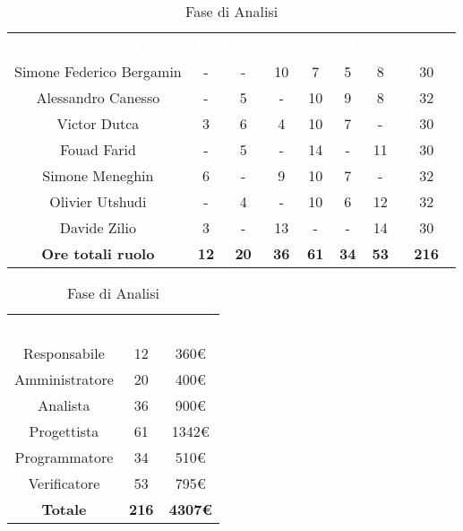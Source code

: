 \renewcommand{\arraystretch}{1.5}


\begin{comment}
BASE PER TUTTI: 30 ORE
Canesso: +2 ore perchè sa che dopo dovrà farne di meno (tanti arretrati)
Utshudi & Meneghin: +2 ore perchè meno arretrati
\end{comment}

\begin{table}[H]
\centering\renewcommand{\arraystretch}{1.5}
\caption{Fase di Analisi}
\vspace{0.2cm}
\begin{tabular}{ c | c | c | c | c | c | c | c }
\rowcolor{redafk}
\textcolor{white}{\textbf{Nominativo}} & \textcolor{white}{\textbf{Re}} & 
\textcolor{white}{\textbf{Am}} & \textcolor{white}{\textbf{An}} &
\textcolor{white}{\textbf{Pt}} & \textcolor{white}{\textbf{Pr}} &
\textcolor{white}{\textbf{Ve}} & \textcolor{white}{\textbf{Totale}} \\
Simone Federico Bergamin & - & - & 10 & 7 & 5 & 8 & 30 \\
Alessandro Canesso & - & 5 & - & 10 & 9 & 8 & 32 \\
Victor Dutca & 3 & 6 & 4 & 10 & 7 & - & 30 \\
Fouad Farid	& - & 5 & - & 14 & - & 11 & 30 \\
Simone Meneghin & 6 & - & 9 & 10 & 7 & - & 32 \\
Olivier Utshudi & - & 4 & - & 10 & 6 & 12 & 32 \\
Davide Zilio & 3 & - & 13 & - & - & 14 & 30 \\
\rowcolor{lastrowcolor}
\textbf{Ore totali ruolo} & \textbf{12} & \textbf{20} & \textbf{36} & \textbf{61} & \textbf{34} & \textbf{53} & \textbf{216} \\
\end{tabular}
\end{table}


\begin{table}[H]
\centering\renewcommand{\arraystretch}{1.5}
\caption{Fase di Analisi}
\vspace{0.2cm}
\begin{tabular}{ c | c | c  }
\rowcolor{redafk}
\textcolor{white}{\textbf{Ruolo}} & \textcolor{white}{\textbf{Ore}} & 
\textcolor{white}{\textbf{Costo}}  \\
Responsabile & 12 & 360€ \\
Amministratore & 20 & 400€ \\
Analista & 36 & 900€ \\
Progettista	& 61 & 1342€ \\
Programmatore & 34 & 510€  \\
Verificatore & 53 & 795€  \\
\rowcolor{lastrowcolor}
\textbf{Totale} & \textbf{216} & \textbf{4307€}  \\
\end{tabular}
\end{table}
